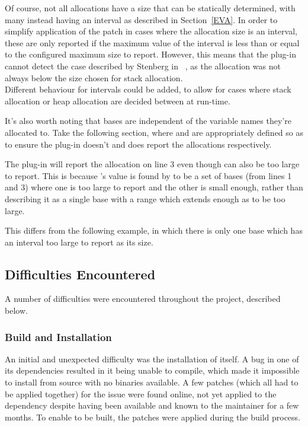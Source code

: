 Of course, not all allocations have a size that can be statically determined, with many instead having an interval as described in Section~\ref{EVA}. In order to simplify application of the patch in cases where the allocation size is an interval, these are only reported if the maximum value of the interval is less than or equal to the configured maximum size to report. However, this means that the plug-in cannot detect the case described by Stenberg in ~\cite{curlmalloc}, as the allocation was not always below the size chosen for stack allocation.\\
Different behaviour for intervals could be added, to allow for cases where stack allocation or heap allocation are decided between at run-time.

It's also worth noting that bases are independent of the variable names they're allocated to. Take the following section, where  and  are appropriately defined so as to ensure the plug-in doesn't and does report the allocations respectively.



The plug-in will report the allocation on line 3 even though  can also be too large to report. This is because 's value is found by  to be a set of bases (from lines 1 and 3) where one is too large to report and the other is small enough, rather than describing it as a single base with a range which extends enough as to be too large.

This differs from the following example, in which there is only one base which has an interval too large to report as its size.



\subsection{Difficulties Encountered}

A number of difficulties were encountered throughout the project, described below.

\subsubsection{Build and Installation}

An initial and unexpected difficulty was the installation of  itself. A bug in one of its dependencies resulted in it being unable to compile, which made it impossible to install from source with no binaries available. A few patches (which all had to be applied together) for the issue were found online, not yet applied to the dependency despite having been available and known to the maintainer for a few months. To enable  to be built, the patches were applied during the build process.

